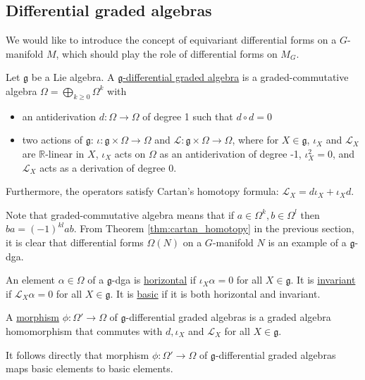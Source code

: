 \subsection{Differential graded algebras}
We would like to introduce the concept of equivariant differential forms on a
$G$-manifold  $M$, which should play the role of differential forms on  $M_G$.
\begin{defn}
	Let $\mathfrak{g}$ be a Lie algebra. A \underline{$\mathfrak{g}$-differential graded
	algebra} is a graded-commutative algebra $\Omega= \bigoplus_{k\geq
	0}\Omega^k$ with 
	\begin{itemize}
		\item an antiderivation $d:\Omega\to\Omega$ of degree 1 such that
	$d\circ d = 0$
		\item two actions of $\mathfrak{g}$: $\iota:\mathfrak{g}\times\Omega\to\Omega$
			and  $\mathcal{L}:\mathfrak{g}\times\Omega\to\Omega$, where for
			$X\in\mathfrak{g}$,  $\iota_X$ and  $\mathcal{L}_X$ are
			$\mathbb{R}$-linear in $X$,  $\iota_X$ acts on  $\Omega$ as an
			antiderivation of degree -1,  $\iota_X^2 = 0$, and  $\mathcal{L}_X$
			acts as a derivation of degree 0.
	\end{itemize}
	Furthermore, the operators satisfy Cartan's homotopy formula:
	$\mathcal{L}_X= d\iota_X+\iota_Xd$.
\end{defn}
Note that graded-commutative algebra means that if $a\in
\Omega^k,b\in\Omega^l$ then $ba = (-1)^{kl}ab$. 
From Theorem \ref{thm:cartan_homotopy} in the previous section, it is
clear that differential forms $\Omega(N)$ on a $G$-manifold  $N$ is an example
of a $\mathfrak{g}$-dga. 

\begin{defn}
	An element $\alpha\in\Omega$ of a $\mathfrak{g}$-dga is 
	\underline{horizontal} if $\iota_X\alpha=0$ for all $X\in\mathfrak{g}$. 
	It is \underline{invariant} if $\mathcal{L}_X\alpha = 0$ for all $X\in
	\mathfrak{g}$. It is \underline{basic} if it is both horizontal and
	invariant.
\end{defn}

\begin{defn} 
	A \underline{morphism} $\phi : \Omega' \to \Omega$ of
	$\mathfrak{g}$-differential graded algebras is a graded algebra homomorphism that
	commutes with  $d,\iota_X$ and  $\mathcal{L}_X$ for all $X\in\mathfrak{g}$.
\end{defn}
It follows directly that 
morphism $\phi : \Omega'\to \Omega$ of $\mathfrak{g}$-differential graded
algebras maps basic elements to basic elements.

